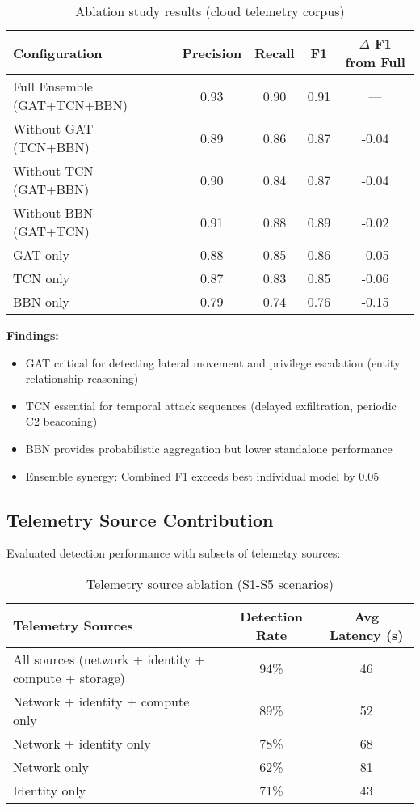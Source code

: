 \begin{table}[H]
\centering
\caption{Ablation study results (cloud telemetry corpus)}
\label{tab:ablation}
\begin{tabular}{lcccc}
\toprule
\textbf{Configuration} & \textbf{Precision} & \textbf{Recall} & \textbf{F1} & \textbf{$\Delta$ F1 from Full} \\
\midrule
Full Ensemble (GAT+TCN+BBN) & 0.93 & 0.90 & 0.91 & --- \\
Without GAT (TCN+BBN) & 0.89 & 0.86 & 0.87 & -0.04 \\
Without TCN (GAT+BBN) & 0.90 & 0.84 & 0.87 & -0.04 \\
Without BBN (GAT+TCN) & 0.91 & 0.88 & 0.89 & -0.02 \\
GAT only & 0.88 & 0.85 & 0.86 & -0.05 \\
TCN only & 0.87 & 0.83 & 0.85 & -0.06 \\
BBN only & 0.79 & 0.74 & 0.76 & -0.15 \\
\bottomrule
\end{tabular}
\end{table}

\textbf{Findings:}
\begin{itemize}
    \item GAT critical for detecting lateral movement and privilege escalation (entity relationship reasoning)
    \item TCN essential for temporal attack sequences (delayed exfiltration, periodic C2 beaconing)
    \item BBN provides probabilistic aggregation but lower standalone performance
    \item Ensemble synergy: Combined F1 exceeds best individual model by 0.05
\end{itemize}

\subsection{Telemetry Source Contribution}
Evaluated detection performance with subsets of telemetry sources:

\begin{table}[H]
\centering
\caption{Telemetry source ablation (S1-S5 scenarios)}
\label{tab:telemetry-ablation}
\begin{tabular}{lcc}
\toprule
\textbf{Telemetry Sources} & \textbf{Detection Rate} & \textbf{Avg Latency (s)} \\
\midrule
All sources (network + identity + compute + storage) & 94\% & 46 \\
Network + identity + compute only & 89\% & 52 \\
Network + identity only & 78\% & 68 \\
Network only & 62\% & 81 \\
Identity only & 71\% & 43 \\
\bottomrule
\end{tabular}
\end{table}


